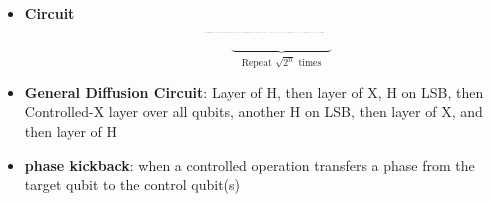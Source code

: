 \begin{multicols}{3}
\begin{itemize}[leftmargin=*,nosep,topsep=0pt]
                    \item \textbf{Circuit}
                      \[
                        \resizebox{0.25\textwidth}{!}{
                          \begin{quantikz}
                            \lstick{$q_{n - 1}$} & \gate{H} & \gate[5]{\shortstack{$f(x)$ \\ Oracle}} & \qw & \gate[5]{\text{Diffusion Circuit}} & \meter{} \\
                            \lstick{$q_{n - 2}$} & \gate{H} & & & & \meter{} \\
                            \vdots & \vdots & & \vdots & & \vdots \\
                            \lstick{$q_1$} & \gate{H} & & & & \meter{} \\
                            \lstick{$q_0$} & \gate{H} & & & & \meter{}
                          \end{quantikz}
                        }
                      \]

                      \[
                        \hspace{1cm}
                        \underbrace{\hspace{3cm}}_{\text{Repeat } \sqrt{2^n} \text{ times}}
                      \]

                    \item \textbf{General Diffusion Circuit}: Layer of H,
                      then layer of X, H on LSB, then Controlled-X layer over
                      all qubits, another H on LSB, then layer of X, and then
                      layer of H

                    \item \textbf{phase kickback}: when a controlled
                      operation transfers a phase from the target qubit to
                      the control qubit(s)
                  \end{itemize}


\end{multicols}
